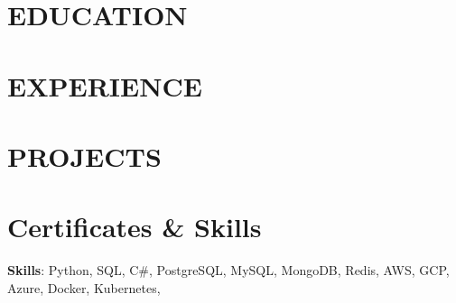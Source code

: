 \documentclass[10pt, letterpaper]{article}
\begin{document}
    \newcommand{\AND}{\unskip
        \cleaders\copy\ANDbox\hskip\wd\ANDbox
        \ignorespaces
    }
    \newsavebox\ANDbox
    \sbox\ANDbox{$|$}
    
    \begin{header}
        \normalsize
    \end{header}

    \vspace{5 pt - 0.3 cm}

\section{EDUCATION}

\vspace{0.2 cm}
\section{EXPERIENCE}

\vspace{0.1 cm}

\vspace{0.1 cm}

\vspace{0.1 cm}

\vspace{0.2 cm}
\section{PROJECTS}

\vspace{0.1 cm}

\vspace{0.2 cm}
\section{Certificates \& Skills}

\textbf{Skills}: Python, SQL, C\#, 
PostgreSQL, MySQL, MongoDB, Redis,
AWS, GCP, Azure, Docker, Kubernetes,
\end{document}

